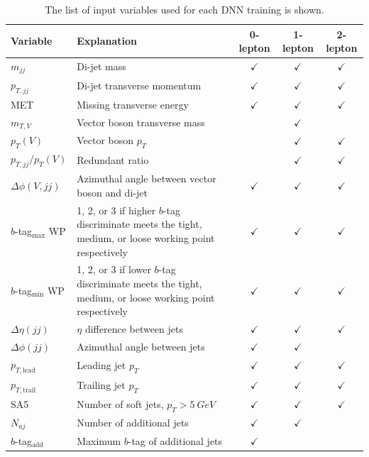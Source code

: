 \begin{table}
  \caption[Resolved DNN inputs]{
    The list of input variables used for each DNN training is shown.
  }
  \centering
  \begin{tabularx}{\textwidth}{|l|X|c|c|c|}
    \hline
    Variable & Explanation & 0-lepton & 1-lepton & 2-lepton \\
    \hline\hline
    $m_{jj}$ & Di-jet mass & $\checkmark$ & $\checkmark$ & $\checkmark$ \\
    $p_{T,jj}$ & Di-jet transverse momentum & $\checkmark$ & $\checkmark$ & $\checkmark$ \\
    MET & Missing transverse energy & $\checkmark$ & $\checkmark$ & $\checkmark$ \\
    \hline
    $m_{T,V}$ & Vector boson transverse mass & & $\checkmark$ & \\
    $p_T(V)$ & Vector boson $p_T$ & & $\checkmark$ & $\checkmark$ \\
    $p_{T,jj}/p_T(V)$ & Redundant ratio & & $\checkmark$ & $\checkmark$ \\
    \hline
    $\Delta\phi(V, jj)$ & Azimuthal angle between vector boson and di-jet & $\checkmark$ & $\checkmark$ & $\checkmark$ \\
    $b$-tag$_\mathrm{max}$ WP & 1, 2, or 3 if higher $b$-tag discriminate meets the tight, medium, or loose working point respectively & $\checkmark$ & $\checkmark$ & $\checkmark$ \\
    $b$-tag$_\mathrm{min}$ WP & 1, 2, or 3 if lower $b$-tag discriminate meets the tight, medium, or loose working point respectively & $\checkmark$ & $\checkmark$ & $\checkmark$ \\
    \hline
    $\Delta\eta(jj)$ & $\eta$ difference between jets & $\checkmark$ & $\checkmark$ & $\checkmark$ \\
    $\Delta\phi(jj)$ & Azimuthal angle between jets & $\checkmark$ & $\checkmark$ & \\
    $p_{T, \mathrm{lead}}$ & Leading jet $p_T$ & $\checkmark$ & $\checkmark$ & $\checkmark$ \\
    \hline
    $p_{T, \mathrm{trail}}$ & Trailing jet $p_T$ & $\checkmark$ & $\checkmark$ & $\checkmark$ \\
    SA5 & Number of soft jets, $p_T > \SI{5}{GeV}$ & $\checkmark$ & $\checkmark$ & $\checkmark$ \\
    $N_{aj}$ & Number of additional jets & $\checkmark$ & $\checkmark$ & \\
    \hline
    $b$-tag$_\mathrm{add}$ & Maximum $b$-tag of additional jets & $\checkmark$ & & \\

\end{tabularx}
\end{table}
